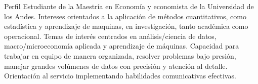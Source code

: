 \documentclass{resume}
\begin{document}
\begin{rSection}{Perfil}
Estudiante de la Maestría en Economía y economista de la Universidad de los Andes. Intereses orientados a la aplicación de métodos cuantitativos, como estadística y aprendizaje de maquinas, en investigación, tanto académica como operacional. Temas de interés centrados en análisis/ciencia de datos, macro/microeconomía aplicada y aprendizaje de máquinas. Capacidad para trabajar en equipo de manera organizada, resolver problemas bajo presión, manejar grandes volúmenes de datos con precisión y atención al detalle. Orientación al servicio implementando habilidades comunicativas efectivas.
\end{rSection}
\end{document}
